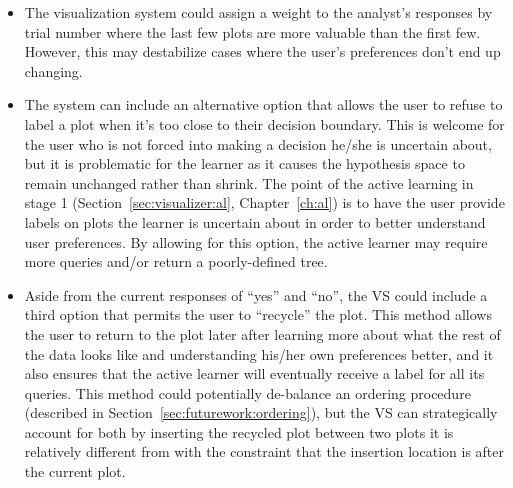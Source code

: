 \tablespacing
\begin{itemize}
	\item The visualization system could assign a weight to the analyst's 
	responses by trial number where the last few plots are more valuable than 
	the first few. However, this may destabilize cases where the user's 
	preferences don't end up changing.
	
	\item The system can include an alternative option that allows the user to 
	refuse to label a plot when it's too close to their decision boundary. This 
	is welcome for the user who is not forced into making a decision he/she is 
	uncertain about, but it is problematic for the learner as it causes the 
	hypothesis space to remain unchanged rather than shrink. The point of the 
	active learning in stage 1 (Section~\ref{sec:visualizer:al}, 
	Chapter~\ref{ch:al}) is to have the user provide labels on plots the 
	learner is uncertain about in order to 
	better understand user preferences. By allowing for this option, the active
	learner may require more queries and/or return a poorly-defined tree. 
	
	\item Aside from the current responses of ``yes'' and ``no'', the VS could 
	include a third option that permits the user to ``recycle'' the plot. This 
	method allows the user to return to the plot later after learning more 
	about what the rest of the data looks like and understanding his/her own 
	preferences better, and it also ensures that the active learner will 
	eventually receive a label for all its queries. This method could 
	potentially de-balance an ordering procedure (described in 
	Section~\ref{sec:futurework:ordering}), but the VS can strategically 
	account for both by inserting the recycled plot between two plots it is 
	relatively different from with the constraint that the insertion location 
	is after the current plot.
\end{itemize}
\bodyspacing
